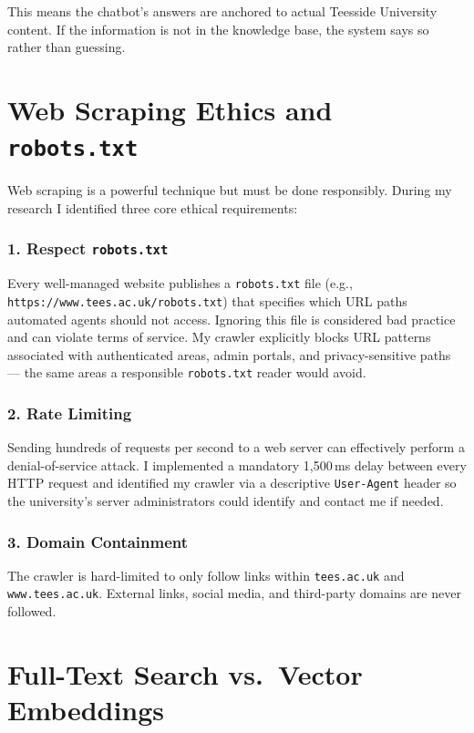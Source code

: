\documentclass[12pt,a4paper]{report}
\begin{document}
This means the chatbot's answers are anchored to actual Teesside University content. If the information is not in the knowledge base, the system says so rather than guessing.

\section{Web Scraping Ethics and \texttt{robots.txt}}

Web scraping is a powerful technique but must be done responsibly. During my research I identified three core ethical requirements:

\subsubsection{1. Respect \texttt{robots.txt}}

Every well-managed website publishes a \texttt{robots.txt} file (e.g., \texttt{https://www.tees.ac.uk/robots.txt}) that specifies which URL paths automated agents should not access. Ignoring this file is considered bad practice and can violate terms of service. My crawler explicitly blocks URL patterns associated with authenticated areas, admin portals, and privacy-sensitive paths --- the same areas a responsible \texttt{robots.txt} reader would avoid.

\subsubsection{2. Rate Limiting}

Sending hundreds of requests per second to a web server can effectively perform a denial-of-service attack. I implemented a mandatory 1,500\,ms delay between every HTTP request and identified my crawler via a descriptive \texttt{User-Agent} header so the university's server administrators could identify and contact me if needed.

\subsubsection{3. Domain Containment}

The crawler is hard-limited to only follow links within \texttt{tees.ac.uk} and \texttt{www.tees.ac.uk}. External links, social media, and third-party domains are never followed.

\section{Full-Text Search vs.\ Vector Embeddings}
\end{document}
